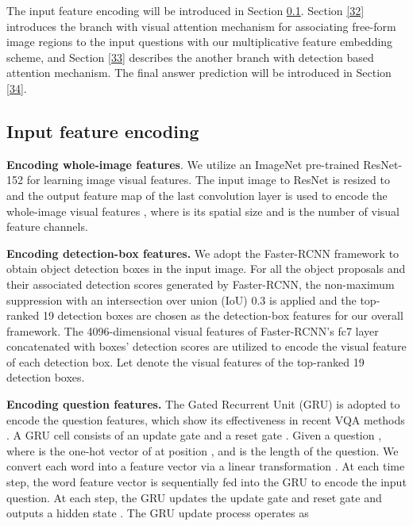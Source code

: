 \documentclass[letterpaper]{article}
\begin{document}
The input feature encoding will be introduced in Section \ref{31}. Section \ref{32} introduces the branch with visual attention mechanism for associating free-form image regions to the input questions with our multiplicative feature embedding scheme, and Section \ref{33} describes the another branch with detection based attention mechanism. The final answer prediction will be introduced in Section \ref{34}.

\subsection{Input feature encoding}\label{31}




\textbf{Encoding whole-image features}. We utilize an ImageNet pre-trained ResNet-152 \cite{he2016deep} for learning image visual features. The input image to ResNet is resized to  and the  output feature map of the last convolution layer is used to encode the whole-image visual features , where  is its spatial size and  is the number of visual feature channels.

\textbf{Encoding detection-box features.} We adopt the Faster-RCNN \cite{ren2015faster} framework to obtain object detection boxes in the input image. For all the object proposals and their associated detection scores generated by Faster-RCNN, the non-maximum suppression with an intersection over union (IoU) 0.3 is applied and the top-ranked 19 detection boxes are chosen as the detection-box features for our overall framework. The 4096-dimensional visual features of Faster-RCNN's fc7 layer concatenated with boxes' detection scores are utilized to encode the visual feature of each detection box. Let  denote the visual features of the top-ranked 19 detection boxes.                                                                                                                                                                                                                                                                                                                                                                                                                                                                                                                                                                                                                                                              

\textbf{Encoding question features.} The Gated Recurrent Unit (GRU) \cite{cho2014learning} is adopted to encode the question features, which show  its effectiveness in recent VQA methods \cite{lu2016hierarchical,kim2016hadamard}. A GRU cell consists of an update gate  and a reset gate . Given a question , where  is the one-hot vector of at position , and  is the length of the question. We convert each word  into a feature vector via a linear transformation . At each time step, the word feature vector  is sequentially fed into the GRU to encode the input question. At each step, the GRU updates the update gate  and reset gate  and outputs a hidden state . The GRU update process operates as
\end{document}
